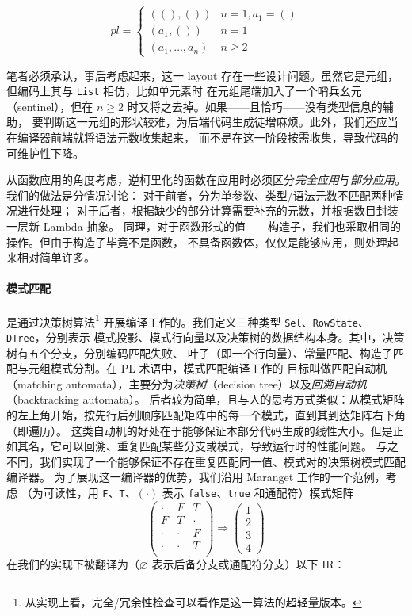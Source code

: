 \begin{equation}
  pl =
  \begin{cases}
    ((), ()) & n = 1, a_1 = ()\\
    (a_1, ()) & n = 1\\
    (a_1,\dots,a_n) & n \ge 2
  \end{cases}
\end{equation}

笔者必须承认，事后考虑起来，这一 layout 存在一些设计问题。虽然它是元组，但编码上其与 \texttt{List} 相仿，比如单元素时
在元组尾端加入了一个哨兵幺元（sentinel），但在 $n\ge 2$ 时又将之去掉。如果——且恰巧——没有类型信息的辅助，
要判断这一元组的形状较难，为后端代码生成徒增麻烦。此外，我们还应当在编译器前端就将语法元数收集起来，
而不是在这一阶段按需收集，导致代码的可维护性下降。

从函数应用的角度考虑，逆柯里化的函数在应用时必须区分\emph{完全应用}与\emph{部分应用}。我们的做法是分情况讨论：
对于前者，分为单参数、类型/语法元数不匹配两种情况进行处理；
对于后者，根据缺少的部分计算需要补充的元数，并根据数目封装一层新 Lambda 抽象。
同理，对于函数形式的值——构造子，我们也采取相同的操作。但由于构造子毕竟不是函数，
不具备函数体，仅仅是能够应用，则处理起来相对简单许多。

\paragraph{模式匹配} 是通过决策树算法\footnote{
  从实现上看，完全/冗余性检查可以看作是这一算法的超轻量版本。
}
开展编译工作的。我们定义三种类型 \texttt{Sel}、\texttt{RowState}、\texttt{DTree}，分别表示
模式投影、模式行向量以及决策树的数据结构本身。其中，决策树有五个分支，分别编码匹配失败、
叶子（即一个行向量）、常量匹配、构造子匹配与元组模式分割。在 PL 术语中，模式匹配编译工作的
目标叫做匹配自动机（matching automata），主要分为\emph{决策树}（decision tree）以及\emph{回溯自动机}（backtracking automata）。
后者较为简单，且与人的思考方式类似：从模式矩阵的左上角开始，按先行后列顺序匹配矩阵中的每一个模式，直到其到达矩阵右下角（即遍历）。
这类自动机的好处在于能够保证本部分代码生成的线性大小。但是正如其名，它可以回溯、重复匹配某些分支或模式，导致运行时的性能问题。
与之不同，我们实现了一个能够保证不存在重复匹配同一值、模式对的决策树模式匹配编译器。
为了展现这一编译器的优势，我们沿用 Maranget 工作的一个范例，考虑
（为可读性，用 \texttt{F}、\texttt{T}、$(\cdot)$ 表示 \texttt{false}、\texttt{true} 和通配符）模式矩阵
\[
  \begin{pmatrix}
    \cdot & F & T \\
    F & T & \cdot \\
    \cdot & \cdot & F \\
    \cdot & \cdot & T \\
  \end{pmatrix}\Longrightarrow
  \begin{pmatrix}
    1 \\ 2 \\ 3 \\ 4
  \end{pmatrix}
\]
在我们的实现下被翻译为（$\varnothing$ 表示后备分支或通配符分支）以下 IR：

